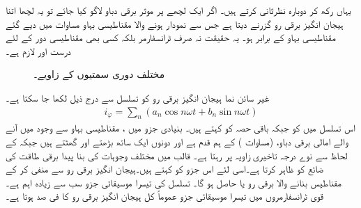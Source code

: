 یہاں رکھ کر دوبارہ نظرثانی کرتے ہیں۔ اگر ایک  لچھے پر  موثر برقی دباو لاگو کیا جائے تو یہ لچھا اتنا ہیجان انگیز برقی رو  گزرنے دیتا ہے جس سے نمودار ہونے والا مقناطیسی بہاو مساوات   میں دیے گئے مقناطیسی بہاو  کے برابر ہو۔ یہ حقیقت  نہ صرف ٹرانسفارمر بلکہ کسی بھی مقناطیسی دور کے لئے درست اور لازم ہے۔
\begin{figure}
\centering
\caption{مختلف دوری سمتیوں کے زاویے۔}
\label{شکل_ٹرانسفارمر_مرکزی_ضیاع_اور_مقناطیسی_رو}
\end{figure}

غیر سائن نما ہیجان انگیز برقی رو  کو  تسلسل سے درج ذیل لکھا جا سکتا ہے۔
\begin{align} 
i_{\varphi}=\sum_n {\left( a_n \cos n \omega t + b_n \sin n\omega t \right)}
\end{align}
اس تسلسل میں  کو   جبکہ باقی حصہ کو    کہتے ہیں۔ بنیادی جزو میں ، مقناطیسی بہاو سے وجود میں آنے والے امالی برقی دباو،   (مساوات )  کے ہم قدم ہے اور  دونوں ایک ساتھ بڑھتے اور گھٹتے ہیں جبکہ   کے لحاظ سے  نوے درجہ تاخیری  زاویہ  پر رہتا ہے۔ قالب میں مختلف وجوہات کی بنا پیدا برقی طاقت کی ضائع  کو  ظاہر  کرتا ہے۔اسی لئے اس جزو کو   کہتے ہیں۔ہیجان انگیز برقی رو  سے  منفی کر کے مقناطیس بنانے والا برقی رو یا
 حاصل ہو گا۔ تسلسل  کی تیسرا موسیقائی جزو سب سے زیادہ اہم  ہے۔ قوی  ٹرانسفارمروں میں  تیسرا موسیقائی جزو عموماً  کل ہیجان انگیز برقی رو  کا  فی صد ہوتا ہے۔  

